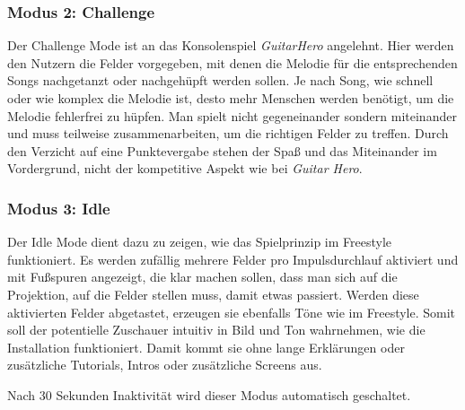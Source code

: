 \subsubsection{Modus 2: Challenge}

Der Challenge Mode ist an das Konsolenspiel \textit{GuitarHero} angelehnt. Hier werden den Nutzern die Felder vorgegeben, mit denen die Melodie für die entsprechenden Songs nachgetanzt oder nachgehüpft werden sollen. Je nach Song, wie schnell oder wie komplex die Melodie ist, desto mehr Menschen werden benötigt, um die Melodie fehlerfrei zu hüpfen. Man spielt nicht gegeneinander sondern miteinander und muss teilweise zusammenarbeiten, um die richtigen Felder zu treffen. Durch den Verzicht auf eine Punktevergabe stehen der Spaß und das Miteinander im Vordergrund, nicht der kompetitive Aspekt wie bei \textit{Guitar Hero}.

\subsubsection{Modus 3: Idle}

Der Idle Mode dient dazu zu zeigen, wie das Spielprinzip im Freestyle funktioniert. Es werden zufällig mehrere Felder pro Impulsdurchlauf aktiviert und mit Fußspuren angezeigt, die klar machen sollen, dass man sich auf die Projektion, auf die Felder stellen muss, damit etwas passiert. Werden diese aktivierten Felder abgetastet, erzeugen sie ebenfalls Töne wie im Freestyle. Somit soll der potentielle Zuschauer intuitiv in Bild und Ton wahrnehmen, wie die Installation funktioniert. Damit kommt sie ohne lange Erklärungen oder zusätzliche Tutorials, Intros oder zusätzliche Screens aus.

Nach 30 Sekunden Inaktivität wird dieser Modus automatisch geschaltet.






